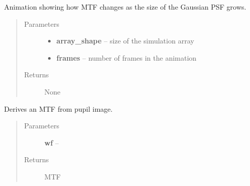 \documentclass[a4paper,11pt,english]{sphinxmanual}
\begin{document}
\begin{fulllineitems}
\label{instrument:sandbox.MTF.GaussianAnimation}
Animation showing how MTF changes as the size of the Gaussian PSF grows.
\begin{quote}\begin{description}
\item[{Parameters}] \leavevmode\begin{itemize}
\item {} 
\textbf{array\_shape} -- size of the simulation array

\item {} 
\textbf{frames} -- number of frames in the animation

\end{itemize}

\item[{Returns}] \leavevmode
None

\end{description}\end{quote}

\end{fulllineitems}


\begin{fulllineitems}
\label{instrument:sandbox.MTF.MTF}
Derives an MTF from pupil image.
\begin{quote}\begin{description}
\item[{Parameters}] \leavevmode
\textbf{wf} -- 

\item[{Returns}] \leavevmode
MTF

\end{description}\end{quote}

\end{fulllineitems}

\end{document}
